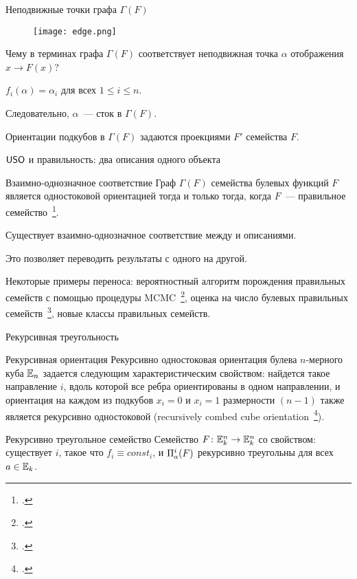 \begin{frame}{Неподвижные точки графа $\Gamma(F)$}
    \begin{figure}
        \centering
        \texttt{[image: edge.png]}
    \end{figure}
    \begin{coloritemize}
        \item Чему в терминах графа $\Gamma(F)$ соответствует неподвижная точка $\alpha$ отображения $x \to F(x)$?
        \pause
        \item $f_i(\alpha) = \alpha_i$ для всех $1 \le i \le n$.
        \pause 
        \item Следовательно, $\alpha$~--- сток в $\Gamma(F)$.
        \pause 
        \item Ориентации подкубов в $\Gamma(F)$ задаются проекциями $F'$ семейства $F$.
    \end{coloritemize}
\end{frame}


\begin{frame}{$\mathsf{USO}$ и правильность: два описания одного объекта}  
    \begin{mytheorem}{Взаимно-однозначное соответствие}
        Граф $\Gamma(F)$ семейства булевых функций $F$ является одностоковой ориентацией тогда и только тогда, когда $F$~--- правильное семейство~\footcite{intsys20, pdm20}.
    \end{mytheorem}
    \pause
    \begin{coloritemize}
        \item Существует взаимно-однозначное соответствие между  и описаниями.
        \item Это позволяет переводить результаты с одного на другой.
        \item Некоторые примеры переноса: вероятностный алгоритм порождения правильных семейств с помощью процедуры MCMC~\footcite{USOphd, galatenko21}, оценка на число булевых правильных семейств~\footcite{dm21}, новые классы правильных семейств.
    \end{coloritemize}    
\end{frame}


\begin{frame}{Рекурсивная треугольность}
    \begin{block}{Рекурсивная ориентация}
        Рекурсивно одностоковая ориентация булева $n$-мерного куба $\mathbb{E}_n$ задается следующим характеристическим свойством: найдется такое направление $i$, вдоль которой все ребра ориентированы в одном направлении, и ориентация на каждом из подкубов $x_i = 0$ и $x_i = 1$ размерности $(n-1)$ также является рекурсивно одностоковой (recursively combed cube orientation~\footcite{gao2020new}).
    \end{block}
    \pause 
    \begin{mytheorem}{Рекурсивно треугольное семейство}
        Семейство $F \colon \mathbb{E}_k^n \to \mathbb{E}_k^n$ со свойством: существует $i$, такое что $f_i \equiv const_i$, и $\Pi_a^i(F)$ рекурсивно треугольны для всех $a \in \mathbb{E}_k$.
    \end{mytheorem}
\end{frame}


